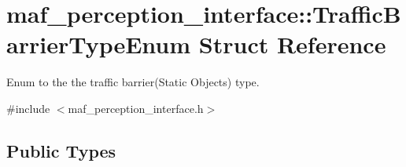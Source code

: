 \hypertarget{structmaf__perception__interface_1_1TrafficBarrierTypeEnum}{}\section{maf\+\_\+perception\+\_\+interface\+:\+:Traffic\+Barrier\+Type\+Enum Struct Reference}
\label{structmaf__perception__interface_1_1TrafficBarrierTypeEnum}


Enum to the the traffic barrier(\+Static Objects) type.  




{\ttfamily \#include $<$maf\+\_\+perception\+\_\+interface.\+h$>$}

\subsection*{Public Types}
